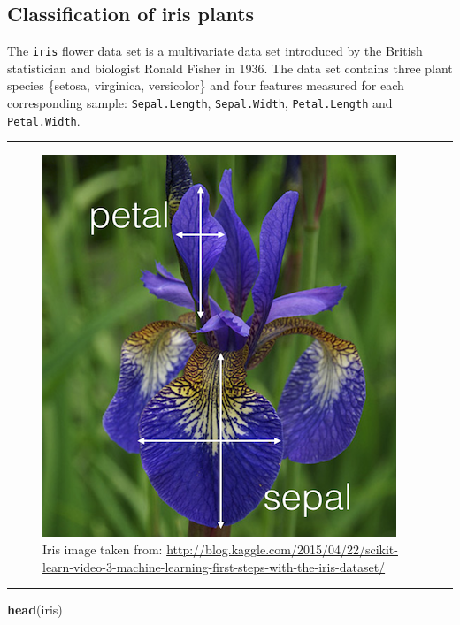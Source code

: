 \documentclass[]{article}
\newenvironment{Shaded}{\begin{snugshade}}{\end{snugshade}}
\newcommand{\KeywordTok}[1]{\textcolor[rgb]{0.13,0.29,0.53}{\textbf{#1}}}
\newcommand{\NormalTok}[1]{#1}
\begin{document}
\hypertarget{classification-of-iris-plants}{%
\subsection{Classification of iris
plants}\label{classification-of-iris-plants}}

The \texttt{iris} flower data set is a multivariate data set introduced
by the British statistician and biologist Ronald Fisher in 1936. The
data set contains three plant species \{setosa, virginica, versicolor\}
and four features measured for each corresponding sample:
\texttt{Sepal.Length}, \texttt{Sepal.Width}, \texttt{Petal.Length} and
\texttt{Petal.Width}.

\begin{center}\rule{0.5\linewidth}{\linethickness}\end{center}

\begin{figure}
\centering
\includegraphics{iris.png}
\caption{Iris image taken from:
\url{http://blog.kaggle.com/2015/04/22/scikit-learn-video-3-machine-learning-first-steps-with-the-iris-dataset/}}
\end{figure}

\begin{center}\rule{0.5\linewidth}{\linethickness}\end{center}

\small

\begin{Shaded}
\begin{Highlighting}[]
\KeywordTok{head}\NormalTok{(iris)}
\end{Highlighting}
\end{Shaded}
\end{document}
